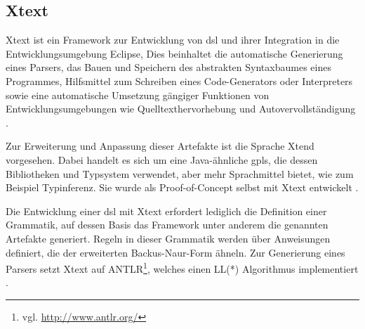 \subsection{Xtext}
    Xtext ist ein Framework zur Entwicklung von \gls{dsl} und ihrer Integration
    in die Entwicklungsumgebung Eclipse,
    Dies beinhaltet die automatische Generierung eines Parsers,
    das Bauen und Speichern des abstrakten Syntaxbaumes eines Programmes,
    Hilfsmittel zum Schreiben eines Code-Generators oder Interpreters
    sowie eine automatische Umsetzung gängiger Funktionen von
    Entwicklungsumgebungen wie Quelltexthervorhebung und Autovervollständigung
    \cite[Kapitel 1]{bettini:xtext}.

    Zur Erweiterung und Anpassung dieser Artefakte ist die Sprache Xtend vorgesehen.
    Dabei handelt es sich um eine Java-ähnliche \glspl{gpl},
    die dessen Bibliotheken und Typsystem verwendet,
    aber mehr Sprachmittel bietet, wie zum Beispiel Typinferenz.
    Sie wurde als Proof-of-Concept selbst mit Xtext entwickelt
    \cite[Kapitel 3]{bettini:xtext}.

    Die Entwicklung einer \gls{dsl} mit Xtext erfordert lediglich die Definition
    einer Grammatik, auf dessen Basis das Framework unter anderem die genannten 
    Artefakte generiert.
    Regeln in dieser Grammatik werden über Anweisungen definiert,
    die der erweiterten Backus-Naur-Form ähneln.
    Zur Generierung eines Parsers setzt Xtext auf
    ANTLR\footnote{vgl. \url{http://www.antlr.org/}},
    welches einen LL(*) Algorithmus implementiert
    \cite{parr:antlr}.